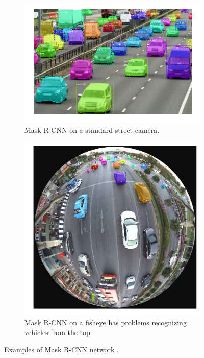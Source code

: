 \documentclass[a4paper,12pt,titlepage, twoside]{article}
\numberwithin{figure}{section}
\begin{document}
\begin{figure}[h!]
    \begin{subfigure}[Sample1]{0.5\linewidth}
    	\includegraphics[width=0.95\linewidth]{fig/Mask-RCNN-road.png} 
        \caption{Mask R-CNN on a standard street camera.}
        \label{fig:mask-street-cam}
    \end{subfigure}
    \quad
    \begin{subfigure}[Sample1]{0.5\linewidth} 
    	\includegraphics[width=0.95\linewidth]{fig/Mask-RCNN-omni.png}
        \caption{Mask R-CNN on a fisheye has problems recognizing vehicles from the top.}   
        \label{fig:mask-omni-cam}
    \end{subfigure}
    \caption{Examples of Mask R-CNN network \cite{he2017mask}.}
    \label{fig:facenet}
\end{figure}
\end{document}
